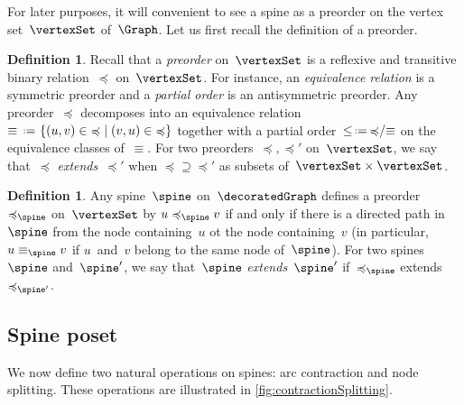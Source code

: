 \documentclass{amsart}
\theoremstyle{definition}
\newtheorem{definition}[theorem]{Definition}
\newcommand{\set}[2]{\left\{ #1 \;\middle|\; #2 \right\}} %
\newcommand{\eqdef}{\mbox{\,\raisebox{0.2ex}{\scriptsize\ensuremath{\mathrm:}}\ensuremath{=}\,}} %
\newcommand{\darkblue}{\color{darkblue}} %
\newcommand{\defn}[1]{\textsl{\darkblue #1}} %
\begin{document}
For later purposes, it will convenient to see a spine as a preorder on the vertex set~$\vertexSet$ of~$\Graph$.
Let us first recall the definition of a preorder.

\begin{definition}
  \label{def:preorder}
  Recall that a \defn{preorder} on~$\vertexSet$ is a reflexive and transitive binary relation~$\preccurlyeq$ on~$\vertexSet$.
  For instance, an \defn{equivalence relation} is a symmetric preorder and a \defn{partial order} is an antisymmetric preorder.
  Any preorder~$\preccurlyeq$ decomposes into an equivalence relation~$\equiv \eqdef \set{(u,v) \in {\preccurlyeq}}{(v,u) \in {\preccurlyeq}}$ together with a partial order~${\le} \eqdef {\preccurlyeq}/{\equiv}$ on the equivalence classes of~$\equiv$.
  For two preorders~$\preccurlyeq, \preccurlyeq'$ on~$\vertexSet$, we say that~$\preccurlyeq$ \defn{extends}~$\preccurlyeq'$ when ${\preccurlyeq} \supseteq {\preccurlyeq'}$ as subsets of~$\vertexSet \times \vertexSet$.
\end{definition}

\begin{definition}
  \label{def:preorderSpine}
  Any spine~$\spine$ on~$\decoratedGraph$ defines a preorder~$\preccurlyeq_{\spine}$ on~$\vertexSet$ by $u \preccurlyeq_{\spine} v$ if and only if there is a directed path in~$\spine$ from the node containing~$u$ ot the node containing~$v$ (in particular, $u \equiv_{\spine} v$ if $u$~and~$v$ belong to the same node of~$\spine$).
  For two spines~$\spine$ and~$\spine'$, we say that~$\spine$ \defn{extends}~$\spine'$ if~$\preccurlyeq_{\spine}$ extends~$\preccurlyeq_{\spine'}$.
\end{definition}


\subsection{Spine poset}
\label{subsec:spinePoset}

We now define two natural operations on spines: arc contraction and node splitting.
These operations are illustrated in \cref{fig:contractionSplitting}.
\end{document}
